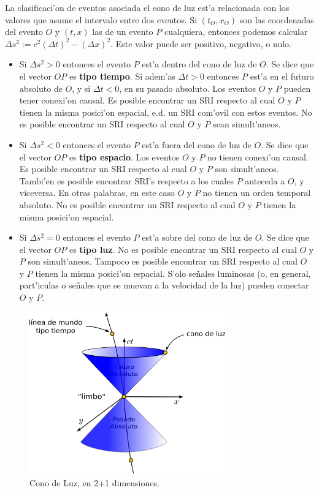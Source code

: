 La clasificaci'on de eventos asociada el cono de luz est'a relacionada con los valores que asume el intervalo entre dos eventos. Si $(t_O,x_O)$ son las coordenadas del evento $O$ y $(t,x)$ las de un evento $P$ cualquiera, entonces podemos calcular $\Delta s^2:=c^2(\Delta t)^2-(\Delta x)^2$. Este valor puede ser positivo, negativo, o nulo.
\begin{itemize}
\item Si $\Delta s^2>0$ entonces el evento $P$ est'a dentro del cono de luz de $O$. Se dice que el vector $OP$ es \textbf{tipo tiempo}. Si adem'as $\Delta t>0$ entonces $P$ est'a en el futuro absoluto de $O$, y si $\Delta t<0$, en su pasado absoluto. Los eventos $O$ y $P$ pueden tener conexi'on causal. Es posible encontrar un SRI respecto al cual $O$ y $P$ tienen la misma posici'on espacial, e.d. un SRI com'ovil con estos eventos. No es posible encontrar un SRI respecto al cual $O$ y $P$ sean simult'aneos.

\item Si $\Delta s^2<0$ entonces el evento $P$ est'a fuera del cono de luz de $O$. Se dice que el vector $OP$ es \textbf{tipo espacio}. Los eventos $O$ y $P$ no tienen conexi'on causal. Es posible encontrar un SRI respecto al cual $O$ y $P$ son simult'aneos. Tambi'en es posible encontrar SRI's respecto a los cuales $P$ anteceda a $O$, y viceversa. En otras palabras, en este caso $O$ y $P$ no tienen un orden temporal absoluto. No es posible encontrar un SRI respecto al cual $O$ y $P$ tienen la misma posici'on espacial.

\item Si $\Delta s^2=0$ entonces el evento $P$ est'a sobre del cono de luz de $O$. Se dice que el vector $OP$ es \textbf{tipo luz}. No es posible encontrar un SRI respecto al cual $O$ y $P$ son  simult'aneos. Tampoco es posible encontrar un SRI respecto al cual $O$ y $P$ tienen la misma posici'on espacial. S'olo se\~nales luminosas (o, en general, part'iculas o se\~nales que se muevan a la velocidad de la luz) pueden conectar $O$ y $P$.
\end{itemize}

\begin{figure}[t]
\centering\includegraphics[height=7cm]{fig/fig-cono-de-luz-2D.pdf}
\caption{Cono de Luz, en 2+1 dimensiones.}
\end{figure}



